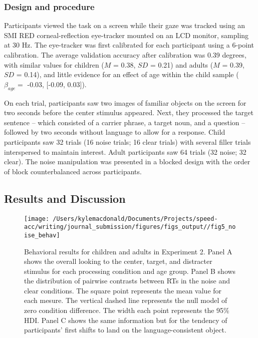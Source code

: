 \documentclass[,man,floatsintext]{apa6}
\begin{document}
\hypertarget{design-and-procedure-1}{%
\subsubsection{Design and procedure}\label{design-and-procedure-1}}

Participants viewed the task on a screen while their gaze was tracked using an SMI RED corneal-reflection eye-tracker mounted on an LCD monitor, sampling at 30 Hz. The eye-tracker was first calibrated for each participant using a 6-point calibration. The average validation accuracy after calibration was 0.39 degrees, with similar values for children (\(M\) = 0.38, \(SD\) = 0.21) and adults (\(M\) = 0.39, \(SD\) = 0.14), and little evidence for an effect of age within the child sample (\(\beta_{age} =\) -0.03, {[}-0.09, 0.03{]}).

On each trial, participants saw two images of familiar objects on the screen for two seconds before the center stimulus appeared. Next, they processed the target sentence -- which consisted of a carrier phrase, a target noun, and a question -- followed by two seconds without language to allow for a response. Child participants saw 32 trials (16 noise trials; 16 clear trials) with several filler trials interspersed to maintain interest. Adult participants saw 64 trials (32 noise; 32 clear). The noise manipulation was presented in a blocked design with the order of block counterbalanced across participants.

\hypertarget{results-and-discussion}{%
\subsection{Results and Discussion}\label{results-and-discussion}}

\begin{figure}[!t]

{\centering \texttt{[image: /Users/kylemacdonald/Documents/Projects/speed-acc/writing/journal\_submission/figures/figs\_output//fig5\_noise\_behav]} 

}

\caption{Behavioral results for children and adults in Experiment 2. Panel A shows the overall looking to the center, target, and distracter stimulus for each processing condition and age group. Panel B shows the distribution of pairwise contrasts between RTs in the noise and clear conditions. The square point represents the mean value for each mesure. The vertical dashed line represents the null model of zero condition difference. The width each point represents the 95\% HDI. Panel C shows the same information but for the tendency of participants' first shifts to land on the language-consistent object.}\label{fig:noise-acc-rt-plot}
\end{figure}
\end{document}
